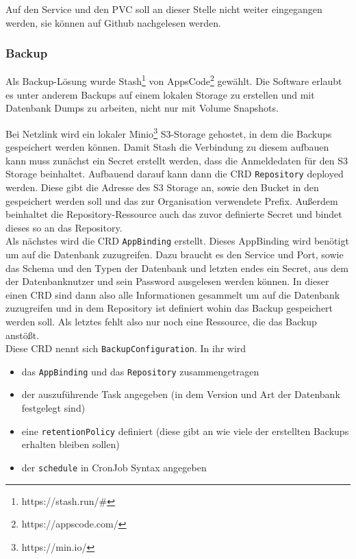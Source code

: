 Auf den Service und den \ac{PVC} soll an dieser Stelle nicht weiter eingegangen werden, sie können auf Github nachgelesen werden. 


\subsubsection{Backup}
Als Backup-Lösung wurde Stash\footnote{https://stash.run/\#} von AppsCode\footnote{https://appscode.com/} gewählt.
Die Software erlaubt es unter anderem Backups auf einem lokalen Storage zu erstellen und mit Datenbank Dumps zu arbeiten, nicht nur mit Volume Snapshots.

Bei Netzlink wird ein lokaler Minio\footnote{https://min.io/} \ac{S3}-Storage gehostet, in dem die Backups gespeichert werden können.
Damit Stash die Verbindung zu diesem aufbauen kann muss zunächst ein Secret erstellt werden, dass die Anmeldedaten für den \ac{S3} Storage beinhaltet.
Aufbauend darauf kann dann die \ac{CRD} \texttt{Repository} deployed werden. 
Diese gibt die Adresse des \ac{S3} Storage an, sowie den Bucket in den gespeichert werden soll und das zur Organisation verwendete Prefix.
Außerdem beinhaltet die Repository-Ressource auch das zuvor definierte Secret und bindet dieses so an das Repository.
\\
Als nächstes wird die \ac{CRD} \texttt{AppBinding} erstellt. 
Dieses AppBinding wird benötigt um auf die Datenbank zuzugreifen. 
Dazu braucht es den Service und Port, sowie das Schema und den Typen der Datenbank und letzten endes ein Secret, aus dem der Datenbanknutzer und sein Password ausgelesen werden können.
In dieser einen \ac{CRD} sind dann also alle Informationen gesammelt um auf die Datenbank zuzugreifen und in dem Repository ist definiert wohin das Backup gespeichert werden soll.
Als letztes fehlt also nur noch eine Ressource, die das Backup anstößt.
\\
Diese \ac{CRD} nennt sich \texttt{BackupConfiguration}. 
In ihr wird 
\begin{itemize}
    \item das \texttt{AppBinding} und das \texttt{Repository} zusammengetragen
    \item der auszuführende Task angegeben (in dem Version und Art der Datenbank festgelegt sind)
    \item eine \texttt{retentionPolicy} definiert (diese gibt an wie viele der erstellten Backups erhalten bleiben sollen)
    \item der \texttt{schedule} in CronJob Syntax angegeben
\end{itemize}
